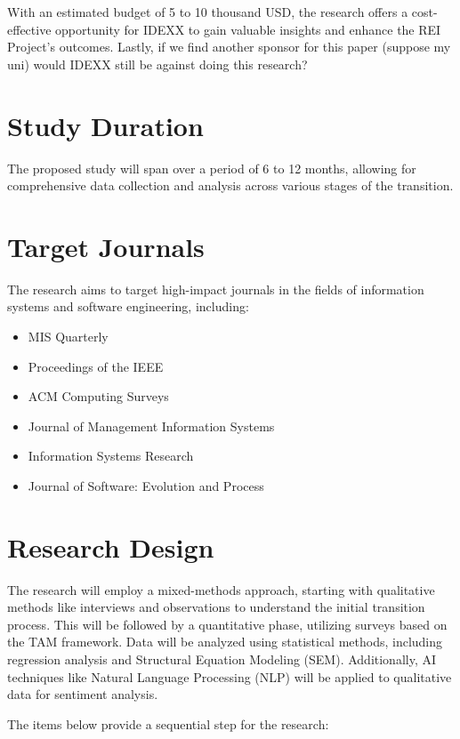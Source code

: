 \documentclass{article}
\begin{document}
With an estimated budget of 5 to 10 thousand USD, the research offers a cost-effective opportunity for IDEXX to gain valuable insights and enhance the REI Project's outcomes. Lastly, if we find another sponsor for this paper (suppose my uni) would IDEXX still be against doing this research?


\section{Study Duration}
\label{sec:duration}

The proposed study will span over a period of 6 to 12 months, allowing for comprehensive data collection and analysis across various stages of the transition.

\section{Target Journals}
\label{sec:targetJournals}

The research aims to target high-impact journals in the fields of information systems and software engineering, including:
\begin{itemize}
    \item MIS Quarterly
    \item Proceedings of the IEEE
    \item ACM Computing Surveys
    \item Journal of Management Information Systems
    \item Information Systems Research
    \item Journal of Software: Evolution and Process
\end{itemize}

\section{Research Design}
\label{sec:researchDesign}

The research will employ a mixed-methods approach, starting with qualitative methods like interviews and observations to understand the initial transition process. This will be followed by a quantitative phase, utilizing surveys based on the TAM framework. Data will be analyzed using statistical methods, including regression analysis and Structural Equation Modeling (SEM). Additionally, AI techniques like Natural Language Processing (NLP) will be applied to qualitative data for sentiment analysis.

The items below provide a sequential step for the research: 
\end{document}
